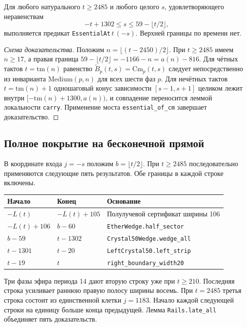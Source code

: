 \begin{theorem}\label{thm:wedge_all}
Для любого натурального $t \ge 2485$ и любого целого $s$, удовлетворяющего неравенствам
\begin{equation}\label{eq:wedge_region}
-t + 1302 \le s \le 59 - \lfloor t/2 \rfloor,
\end{equation}
выполняется предикат \texttt{EssentialAt}\,$t\,(-s)$. Верхней границы по времени нет.
\end{theorem}

\begin{proof}[Схема доказательства]
Положим $n = \lfloor (t - 2450) / 2 \rfloor$. При $t \ge 2485$ имеем $n \ge 17$, а правая граница $59 - \lfloor t/2 \rfloor = -1166 - n = a(n) - 816$. Для чётных тактов $t = \mathrm{tm}(n)$ равенство $\widetilde B_p(t, s) = \mathrm{Cm}_p(t, s)$ следует непосредственно из инварианта $\mathrm{Medium}(p, n)$ для всех шести фаз $p$. Для нечётных тактов $t = \mathrm{tm}(n) + 1$ одношаговый конус зависимости $[s - 1, s + 1]$ целиком лежит внутри $[-\mathrm{tm}(n) + 1300, a(n))$, и совпадение переносится леммой локальности \texttt{carry}. Применение моста \texttt{essential\_of\_cm} завершает доказательство.
\end{proof}

\subsection{Полное покрытие на бесконечной прямой}\label{sec:five-bands}
В координате входа $j=-s$ положим $b=\lfloor t/2\rfloor$. При $t\ge2485$ последовательно применяются следующие пять результатов. Обе границы в каждой строке включены.
\begin{center}
\begin{tabular}{lll}
\toprule
Начало & Конец & Основание \\
\midrule
$-L(t)$ & $-L(t)+105$ & Полулучевой сертификат ширины 106 \\
$-L(t)+106$ & $b-60$ & \texttt{EtherWedge.half\_sector} \\
$b-59$ & $t-1302$ & \texttt{Crystal50Wedge.wedge\_all} \\
$t-1301$ & $t-20$ & \texttt{LeftCrystal50.left\_strip} \\
$t-19$ & $t$ & \texttt{right\_boundary\_width20} \\
\bottomrule
\end{tabular}
\end{center}
Три фазы эфира периода 14 дают вторую строку уже при $t\ge210$. Последняя строка усиливает раннюю правую полосу ширины восемь. При $t=2485$ третья строка состоит из единственной клетки $j=1183$. Начало каждой следующей строки на единицу больше конца предыдущей. Лемма \texttt{Rails.late\_all} объединяет пять доказательств.

